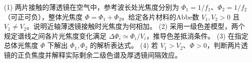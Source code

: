 (1) 两片接触的薄透镜在空气中，参考波长处光焦度分别为 \(\Phi_1=1/f_1\)、\(\Phi_2=1/f_2\)（可正可负），整体光焦度 \(\Phi=\Phi_1+\Phi_2\)。给定各片材料的Abbe数 \(V_1,V_2>0\) 且 \(V_1\ne V_2\)。说明近轴薄透镜接触时光焦度为何相加。
(2) 采用一级色差模型，两个规定谱线之间各片光焦度变化满足 \(\Delta\Phi_i\simeq\Phi_i/V_i\)，推导色差抵消条件。
(3) 在指定总体光焦度 \(\Phi\) 下解出 \(\Phi_1,\Phi_2\) 的解析表达式。
(4) 若 \(V_1>V_2\)、\(\Phi>0\)，判断两片透镜的正负焦度并解释实际剩余二级色谱及厚透镜间隔效应。
